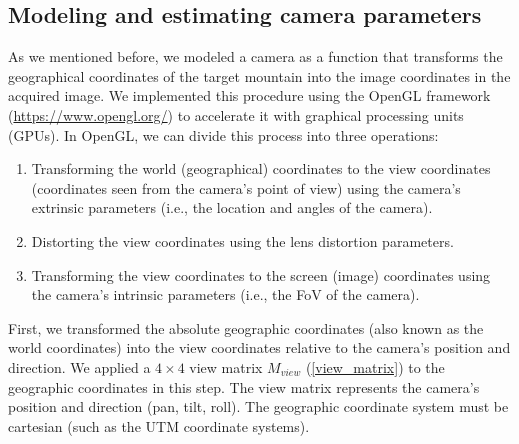 \documentclass{article}
\providecommand{\tightlist}{%
  \setlength{\itemsep}{0pt}\setlength{\parskip}{0pt}}
\begin{document}
\hypertarget{modeling-and-estimating-camera-parameters}{%
\subsection{Modeling and estimating camera parameters}\label{modeling-and-estimating-camera-parameters}}

As we mentioned before, we modeled a camera as a function that transforms the geographical coordinates of the target mountain into the image coordinates in the acquired image. We implemented this procedure using the OpenGL framework (\url{https://www.opengl.org/}) to accelerate it with graphical processing units (GPUs). In OpenGL, we can divide this process into three operations:

\begin{enumerate}
\def\labelenumi{\arabic{enumi}.}
\tightlist
\item
  Transforming the world (geographical) coordinates to the view coordinates (coordinates seen from the camera's point of view) using the camera's extrinsic parameters (i.e., the location and angles of the camera).\\
\item
  Distorting the view coordinates using the lens distortion parameters.\\
\item
  Transforming the view coordinates to the screen (image) coordinates using the camera's intrinsic parameters (i.e., the FoV of the camera).
\end{enumerate}

First, we transformed the absolute geographic coordinates (also known as the world coordinates) into the view coordinates relative to the camera's position and direction. We applied a \(4 \times 4\) view matrix \(M_{view}\) (\ref{view_matrix}) to the geographic coordinates in this step. The view matrix represents the camera's position and direction (pan, tilt, roll). The geographic coordinate system must be cartesian (such as the UTM coordinate systems).
\end{document}
